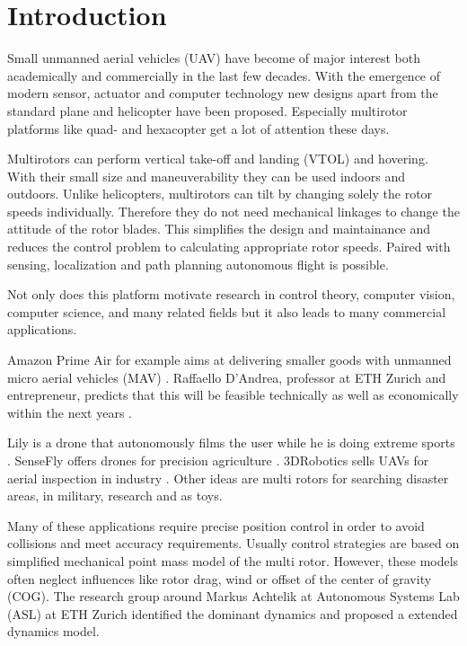 \chapter{Introduction}
\label{sec:introduction}

 Small unmanned aerial vehicles (UAV) have become of major interest both academically and commercially in the last few decades. With the emergence of modern sensor, actuator and computer technology new designs apart from the standard plane and helicopter have been proposed.  Especially multirotor platforms like quad- and hexacopter get a lot of attention these days.

 Multirotors can perform vertical take-off and landing (VTOL) and hovering. With their small size and maneuverability they can be used indoors and outdoors. Unlike helicopters, multirotors can tilt by changing solely the rotor speeds individually. Therefore they do not need mechanical linkages to change the attitude of the rotor blades. This simplifies the design and maintainance and reduces the control problem to calculating appropriate rotor speeds. Paired with sensing, localization and path planning autonomous flight is possible. 

 Not only does this platform motivate research in control theory, computer vision, computer science, and many related fields but it also leads to many commercial applications. 

Amazon Prime Air for example aims at delivering smaller goods with unmanned micro aerial vehicles (MAV) \cite{www:primeair}. Raffaello D'Andrea, professor at ETH Zurich and entrepreneur, predicts that this will be feasible technically as well as economically within the next years \cite{DAndrea2014}. 

Lily is a drone that autonomously films the user while he is doing extreme sports \cite{www:lily}. SenseFly offers drones for precision agriculture \cite{www:sensefly}. 3DRobotics sells UAVs for aerial inspection in industry \cite{www:3drobotics}. Other ideas are multi rotors for searching disaster areas, in military, research and as toys.

Many of these applications require precise position control in order to avoid collisions and meet accuracy requirements. Usually control strategies are based on simplified mechanical point mass model of the multi rotor. However, these models often neglect influences like rotor drag, wind or offset of the center of gravity (COG). The research group around Markus Achtelik at Autonomous Systems Lab (ASL) at ETH Zurich identified the dominant dynamics and proposed a extended dynamics model. 

